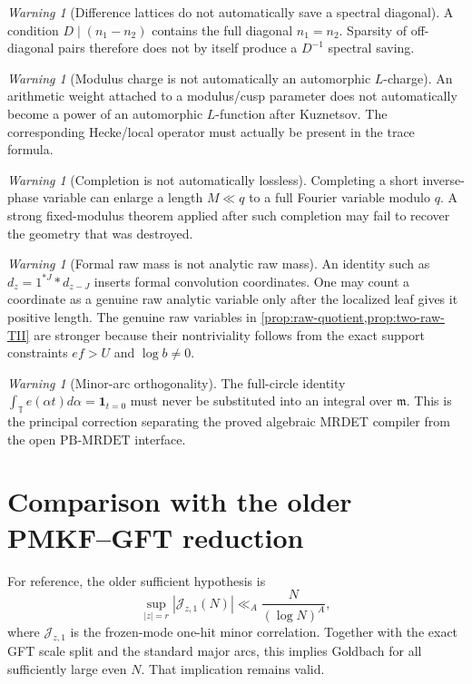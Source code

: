 \documentclass[11pt]{article}
\theoremstyle{definition}
\theoremstyle{remark}
\newtheorem{warning}[theorem]{Warning}
\newcommand{\T}{\mathbb T}
\newcommand{\1}{\mathbf 1}
\newcommand{\mcal}{\mathfrak m}
\newcommand{\PBM}{\mathrm{PB}\text{-}\mathrm{MRDET}}
\begin{document}
\begin{warning}[Difference lattices do not automatically save a spectral diagonal]
A condition \(D\mid(n_1-n_2)\) contains the full diagonal \(n_1=n_2\).  Sparsity of off-diagonal pairs therefore does not by itself produce a \(D^{-1}\) spectral saving.
\end{warning}

\begin{warning}[Modulus charge is not automatically an automorphic \(L\)-charge]
An arithmetic weight attached to a modulus/cusp parameter does not automatically become a power of an automorphic \(L\)-function after Kuznetsov.  The corresponding Hecke/local operator must actually be present in the trace formula.
\end{warning}

\begin{warning}[Completion is not automatically lossless]
Completing a short inverse-phase variable can enlarge a length \(M\ll q\) to a full Fourier variable modulo \(q\).  A strong fixed-modulus theorem applied after such completion may fail to recover the geometry that was destroyed.
\end{warning}

\begin{warning}[Formal raw mass is not analytic raw mass]
An identity such as \(d_z=1^{*J}*d_{z-J}\) inserts formal convolution coordinates.  One may count a coordinate as a genuine raw analytic variable only after the localized leaf gives it positive length.  The genuine raw variables in \cref{prop:raw-quotient,prop:two-raw-TII} are stronger because their nontriviality follows from the exact support constraints \(ef>U\) and \(\log b\ne0\).
\end{warning}

\begin{warning}[Minor-arc orthogonality]
The full-circle identity \(\int_\T e(\alpha t)d\alpha=\1_{t=0}\) must never be substituted into an integral over \(\mcal\).  This is the principal correction separating the proved algebraic MRDET compiler from the open \(\PBM\) interface.
\end{warning}

\section{Comparison with the older PMKF--GFT reduction}\label{app:pmkf}

For reference, the older sufficient hypothesis is
\[
 \sup_{|z|=r}|\mathcal J_{z,1}(N)|
 \ll_A \frac{N}{(\log N)^A},
\]
where \(\mathcal J_{z,1}\) is the frozen-mode one-hit minor correlation.  Together with the exact GFT scale split and the standard major arcs, this implies Goldbach for all sufficiently large even \(N\).  That implication remains valid.
\end{document}
